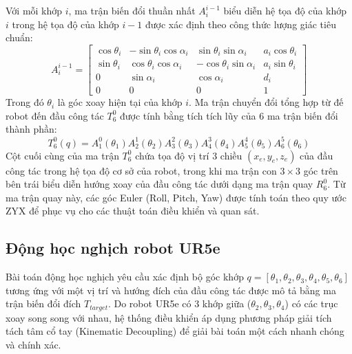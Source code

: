\documentclass[conference]{IEEEtran}
\begin{document}
Với mỗi khớp $i$, ma trận biến đổi thuần nhất $A_i^{i-1}$ biểu diễn hệ tọa độ của khớp $i$ trong hệ tọa độ của khớp $i-1$ được xác định theo công thức lượng giác tiêu chuẩn:
\begin{equation}
A_i^{i-1} = \begin{bmatrix}
\cos\theta_i & -\sin\theta_i\cos\alpha_i & \sin\theta_i\sin\alpha_i & a_i\cos\theta_i \\
\sin\theta_i & \cos\theta_i\cos\alpha_i & -\cos\theta_i\sin\alpha_i & a_i\sin\theta_i \\
0 & \sin\alpha_i & \cos\alpha_i & d_i \\
0 & 0 & 0 & 1
\end{bmatrix}
\end{equation}
Trong đó $\theta_i$ là góc xoay hiện tại của khớp $i$. Ma trận chuyển đổi tổng hợp từ đế robot đến đầu công tác $T_6^0$ được tính bằng tích tích lũy của 6 ma trận biến đổi thành phần:
\begin{equation}
T_6^0(q) = A_1^0(\theta_1) A_2^1(\theta_2) A_3^2(\theta_3) A_4^3(\theta_4) A_5^4(\theta_5) A_6^5(\theta_6)
\end{equation}
Cột cuối cùng của ma trận $T_6^0$ chứa tọa độ vị trí 3 chiều $(x_e, y_e, z_e)$ của đầu công tác trong hệ tọa độ cơ sở của robot, trong khi ma trận con $3 \times 3$ góc trên bên trái biểu diễn hướng xoay của đầu công tác dưới dạng ma trận quay $R_6^0$. Từ ma trận quay này, các góc Euler (Roll, Pitch, Yaw) được tính toán theo quy ước ZYX để phục vụ cho các thuật toán điều khiển và quan sát.

\subsection{Động học nghịch robot UR5e}
Bài toán động học nghịch yêu cầu xác định bộ góc khớp $q = [\theta_1, \theta_2, \theta_3, \theta_4, \theta_5, \theta_6]$ tương ứng với một vị trí và hướng đích của đầu công tác được mô tả bằng ma trận biến đổi đích $T_{target}$. Do robot UR5e có 3 khớp giữa ($\theta_2, \theta_3, \theta_4$) có các trục xoay song song với nhau, hệ thống điều khiển áp dụng phương pháp giải tích tách tâm cổ tay (Kinematic Decoupling) để giải bài toán một cách nhanh chóng và chính xác.
\end{document}
